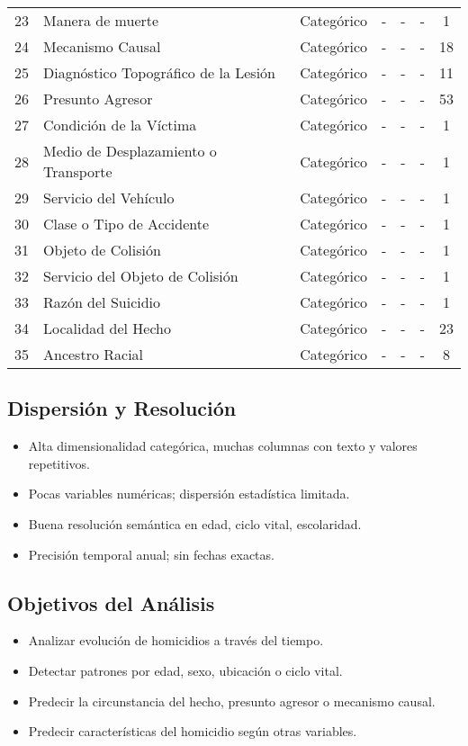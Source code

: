 \documentclass[lettersize,journal]{IEEEtran}
\begin{document}
\begin{table*}[htbp]
\begin{tabularx}{\textwidth}{|c|X|c|c|c|c|c|}
  23 & Manera de muerte & Categórico & - & - & - & 1 \\
  24 & Mecanismo Causal & Categórico & - & - & - & 18 \\
  25 & Diagnóstico Topográfico de la Lesión & Categórico & - & - & - & 11 \\
  26 & Presunto Agresor & Categórico & - & - & - & 53 \\
  27 & Condición de la Víctima & Categórico & - & - & - & 1 \\
  28 & Medio de Desplazamiento o Transporte & Categórico & - & - & - & 1 \\
  29 & Servicio del Vehículo & Categórico & - & - & - & 1 \\
  30 & Clase o Tipo de Accidente & Categórico & - & - & - & 1 \\
  31 & Objeto de Colisión & Categórico & - & - & - & 1 \\
  32 & Servicio del Objeto de Colisión & Categórico & - & - & - & 1 \\
  33 & Razón del Suicidio & Categórico & - & - & - & 1 \\
  34 & Localidad del Hecho & Categórico & - & - & - & 23 \\
  35 & Ancestro Racial & Categórico & - & - & - & 8 \\
\hline
\end{tabularx}
\end{table*}
  

\subsection{Dispersión y Resolución}

\begin{itemize}
    \item Alta dimensionalidad categórica, muchas columnas con texto y valores repetitivos.
    \item Pocas variables numéricas; dispersión estadística limitada.
    \item Buena resolución semántica en edad, ciclo vital, escolaridad.
    \item Precisión temporal anual; sin fechas exactas.
\end{itemize}
  	  

\subsection{Objetivos del Análisis}

\begin{itemize}
    \item Analizar evolución de homicidios a través del tiempo.
    \item Detectar patrones por edad, sexo, ubicación o ciclo vital.
    \item Predecir la circunstancia del hecho, presunto agresor o mecanismo causal.
    \item Predecir características del homicidio según otras variables.
\end{itemize}
\end{document}
